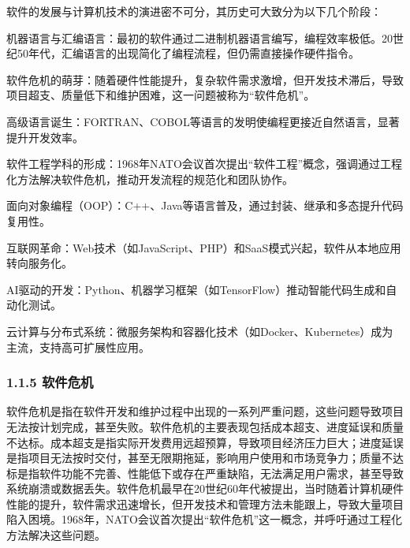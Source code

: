 软件的发展与计算机技术的演进密不可分，其历史可大致分为以下几个阶段：


机器语言与汇编语言：最初的软件通过二进制机器语言编写，编程效率极低。20世纪50年代，汇编语言的出现简化了编程流程，但仍需直接操作硬件指令。

软件危机的萌芽：随着硬件性能提升，复杂软件需求激增，但开发技术滞后，导致项目超支、质量低下和维护困难，这一问题被称为``软件危机''。


高级语言诞生：FORTRAN、COBOL等语言的发明使编程更接近自然语言，显著提升开发效率。

软件工程学科的形成：1968年NATO会议首次提出``软件工程''概念，强调通过工程化方法解决软件危机，推动开发流程的规范化和团队协作。


面向对象编程（OOP）：C++、Java等语言普及，通过封装、继承和多态提升代码复用性。

互联网革命：Web技术（如JavaScript、PHP）和SaaS模式兴起，软件从本地应用转向服务化。


AI驱动的开发：Python、机器学习框架（如TensorFlow）推动智能代码生成和自动化测试。

云计算与分布式系统：微服务架构和容器化技术（如Docker、Kubernetes）成为主流，支持高可扩展性应用。

\hypertarget{ux8f6fux4ef6ux5371ux673a}{%
\subsubsection{1.1.5 软件危机}\label{ux8f6fux4ef6ux5371ux673a}}


软件危机是指在软件开发和维护过程中出现的一系列严重问题，这些问题导致项目无法按计划完成，甚至失败。软件危机的主要表现包括成本超支、进度延误和质量不达标。成本超支是指实际开发费用远超预算，导致项目经济压力巨大；进度延误是指项目无法按时交付，甚至无限期拖延，影响用户使用和市场竞争力；质量不达标是指软件功能不完善、性能低下或存在严重缺陷，无法满足用户需求，甚至导致系统崩溃或数据丢失。软件危机最早在20世纪60年代被提出，当时随着计算机硬件性能的提升，软件需求迅速增长，但开发技术和管理方法未能跟上，导致大量项目陷入困境。1968年，NATO会议首次提出``软件危机''这一概念，并呼吁通过工程化方法解决这些问题。

